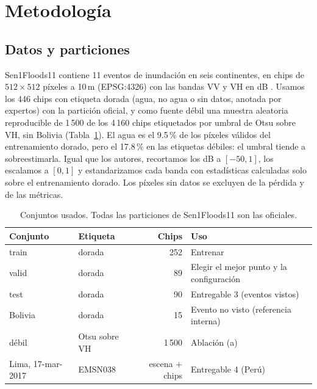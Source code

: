 \documentclass[10pt]{article}
\begin{document}
\section{Metodología}
\label{sec:metodo}
\subsection{Datos y particiones}
\label{sec:datos}
Sen1Floods11 contiene 11 eventos de inundación en seis continentes, en chips de $512\times512$ píxeles a 10\,m (EPSG:4326) con las bandas VV y VH en dB \citep{bonafilia2020}. Usamos los 446 chips con etiqueta dorada (agua, no agua o sin datos, anotada por expertos) con la partición oficial, y como fuente débil una muestra aleatoria reproducible de 1\,500 de los 4\,160 chips etiquetados por umbral de Otsu sobre VH, sin Bolivia (Tabla~\ref{tab:datos}). El agua es el 9.5\,\% de los píxeles válidos del entrenamiento dorado, pero el 17.8\,\% en las etiquetas débiles: el umbral tiende a sobreestimarla. Igual que los autores, recortamos los dB a $[-50,1]$, los escalamos a $[0,1]$ y estandarizamos cada banda con estadísticas calculadas solo sobre el entrenamiento dorado. Los píxeles sin datos se excluyen de la pérdida y de las métricas.

\begin{table}[h]
\centering\small
\caption{Conjuntos usados. Todas las particiones de Sen1Floods11 son las oficiales.}
\label{tab:datos}
\begin{tabular}{llrl}
\toprule
\textbf{Conjunto} & \textbf{Etiqueta} & \textbf{Chips} & \textbf{Uso} \\
\midrule
train & dorada & 252 & Entrenar \\
valid & dorada & 89 & Elegir el mejor punto y la configuración \\
test & dorada & 90 & Entregable 3 (eventos vistos) \\
Bolivia & dorada & 15 & Evento no visto (referencia interna) \\
débil & Otsu sobre VH & 1\,500 & Ablación (a) \\
Lima, 17-mar-2017 & EMSN038 & escena + chips & Entregable 4 (Perú) \\
\bottomrule
\end{tabular}
\end{table}
\end{document}

